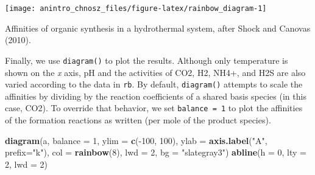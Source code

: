 \documentclass[]{tufte-book}
\newenvironment{Shaded}{}{}
\newcommand{\KeywordTok}[1]{\textcolor[rgb]{0.00,0.44,0.13}{\textbf{#1}}}
\newcommand{\DataTypeTok}[1]{\textcolor[rgb]{0.56,0.13,0.00}{#1}}
\newcommand{\DecValTok}[1]{\textcolor[rgb]{0.25,0.63,0.44}{#1}}
\newcommand{\FloatTok}[1]{\textcolor[rgb]{0.25,0.63,0.44}{#1}}
\newcommand{\StringTok}[1]{\textcolor[rgb]{0.25,0.44,0.63}{#1}}
\newcommand{\OperatorTok}[1]{\textcolor[rgb]{0.40,0.40,0.40}{#1}}
\newcommand{\NormalTok}[1]{#1}
\begin{document}
\begin{Shaded}
\end{Shaded}

\begin{marginfigure}
\texttt{[image: anintro\_chnosz\_files/figure-latex/rainbow\_diagram-1]} \caption[Affinities of organic synthesis in a hydrothermal system, after Shock and Canovas (2010)]{Affinities of organic synthesis in a hydrothermal system, after Shock and Canovas (2010).}\label{fig:rainbow_diagram}
\end{marginfigure}

Finally, we use {\texttt{diagram()}} to plot the results. Although only
temperature is shown on the \emph{x} axis, pH and the activities of CO2,
H2, NH4+, and H2S are also varied according to the data in \texttt{rb}.
By default, {\texttt{diagram()}} attempts to scale the affinities by
dividing by the reaction coefficients of a shared basis species (in this
case, CO2). To override that behavior, we set \texttt{balance\ =\ 1} to
plot the affinities of the formation reactions as written (per mole of
the product species).

\begin{Shaded}
\begin{Highlighting}[]
\KeywordTok{diagram}\NormalTok{(a, }\DataTypeTok{balance =} \DecValTok{1}\NormalTok{, }\DataTypeTok{ylim =} \KeywordTok{c}\NormalTok{(}\OperatorTok{-}\DecValTok{100}\NormalTok{, }\DecValTok{100}\NormalTok{), }\DataTypeTok{ylab =} \KeywordTok{axis.label}\NormalTok{(}\StringTok{"A"}\NormalTok{, }\DataTypeTok{prefix=}\StringTok{"k"}\NormalTok{),}
        \DataTypeTok{col =} \KeywordTok{rainbow}\NormalTok{(}\DecValTok{8}\NormalTok{), }\DataTypeTok{lwd =} \DecValTok{2}\NormalTok{, }\DataTypeTok{bg =} \StringTok{"slategray3"}\NormalTok{)}
\KeywordTok{abline}\NormalTok{(}\DataTypeTok{h =} \DecValTok{0}\NormalTok{, }\DataTypeTok{lty =} \DecValTok{2}\NormalTok{, }\DataTypeTok{lwd =} \DecValTok{2}\NormalTok{)}
\end{Highlighting}
\end{Shaded}
\end{document}
